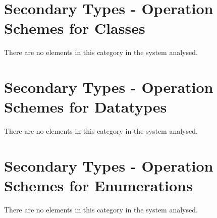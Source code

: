 

\section{Secondary Types - Operation Schemes for Classes}
There are no elements in this category in the system analysed.





\section{Secondary Types - Operation Schemes for Datatypes}
There are no elements in this category in the system analysed.



\section{Secondary Types - Operation Schemes for Enumerations}
There are no elements in this category in the system analysed.


